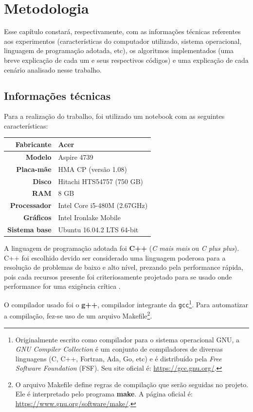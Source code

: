 \chapter{Metodologia}
Esse capítulo constará, respectivamente, com as informações técnicas referentes aos experimentos (características do computador utilizado, sistema operacional, linguagem de programação adotada, etc), os algoritmos implementados (uma breve explicação de cada um e seus respectivos códigos) e uma explicação de cada cenário analisado nesse trabalho.

\section{Informações técnicas}
Para a realização do trabalho, foi utilizado um notebook com as seguintes características:

\begin{tabular}{| r | l |}
	\hline
	\textbf{Fabricante}   & Acer \\
	\hline
	\textbf{Modelo}       & Aspire 4739 \\
	\hline
	\textbf{Placa-mãe}    & HMA CP (versão 1.08) \\
	\hline
	\textbf{Disco}        & Hitachi HTS54757 (750 GB) \\
	\hline
	\textbf{RAM}          & 8 GB \\
	\hline
	\textbf{Processador}  & Intel Core i5-480M (2.67GHz) \\
	\hline
	\textbf{Gráficos}     & Intel Ironlake Mobile \\
	\hline
	\textbf{Sistema base} & Ubuntu 16.04.2 LTS 64-bit \\
	\hline
\end{tabular}

A linguagem de programação adotada foi \textbf{C++} (\textit{C mais mais} ou \textit{C plus plus}). C++ foi escolhido devido ser considerado uma linguagem poderosa para a resolução de problemas de baixo e alto nível, prezando pela performance rápida, pois cada recursos presente foi criteriosamente projetado para se usado onde performance for uma exigência crítica \cite{meyers1997cpp}.

O compilador usado foi o \textbf{g++}, compilador integrante da \texttt{gcc}\footnote{Originalmente escrito como compilador para o sistema operacional GNU, a \textit{GNU Compiler Collection} é um conjunto de compiladores de diversas linguagens (C, C++, Fortran, Ada, Go, etc) e é distribuído pela \textit{Free Software Foundation} (FSF). Seu site oficial é: \url{https://gcc.gnu.org/}.}. Para automatizar a compilação, fez-se uso de um arquivo Makefile\footnote{O arquivo Makefile define regras de compilação que serão seguidas no projeto. Ele é interpretado pelo programa \textbf{make}. A página oficial é: \url{https://www.gnu.org/software/make/}.}.

